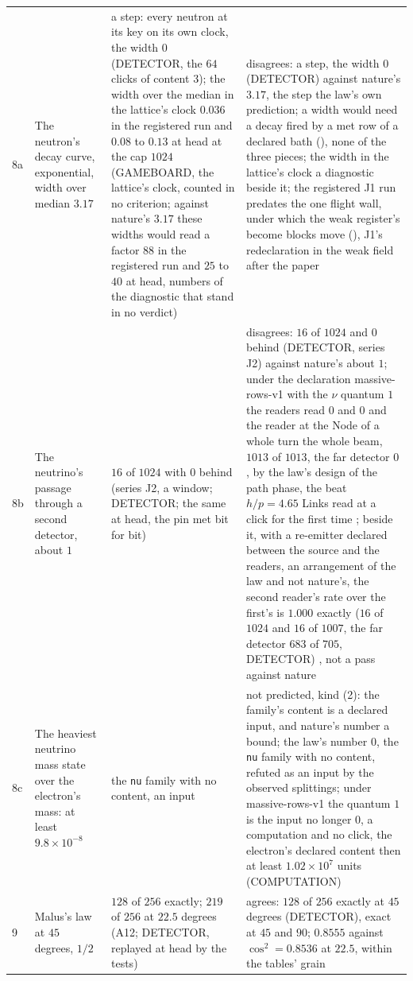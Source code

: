 {\begin{longtable}{L{0.3in}L{2.0in}L{1.5in}L{2.2in}}
8a & The neutron's decay curve, exponential, width over median $3.17$ \cite{gonzalez2021} & a step: every neutron at its key on its own clock, the width $0$ (DETECTOR, the $64$ clicks of content $3$); the width over the median in the lattice's clock $0.036$ in the registered run and $0.08$ to $0.13$ at head at the cap $1024$ (GAMEBOARD, the lattice's clock, counted in no criterion; against nature's $3.17$ these widths would read a factor $88$ in the registered run and $25$ to $40$ at head, numbers of the diagnostic that stand in no verdict) & disagrees: a step, the width $0$ (DETECTOR) against nature's $3.17$, the step the law's own prediction; a width would need a decay fired by a met row of a declared bath (\cite[section 1.8]{failrows}), none of the three pieces; the width in the lattice's clock a diagnostic beside it; the registered J1 run predates the one flight wall, under which the weak register's become blocks move (\cite[records 931 to 933]{log}), J1's redeclaration in the weak field after the paper \\
8b & The neutrino's passage through a second detector, about $1$ & $16$ of $1024$ with $0$ behind (series J2, a window; DETECTOR; the same at head, the pin met bit for bit) & disagrees: $16$ of $1024$ and $0$ behind (DETECTOR, series J2) against nature's about $1$; under the declaration massive-rows-v1 with the $\nu$ quantum $1$ the readers read $0$ and $0$ and the reader at the Node of a whole turn the whole beam, $1013$ of $1013$, the far detector $0$, by the law's design of the path phase, the beat $h/p = 4.65$ Links read at a click for the first time \cite{run8bc}; beside it, with a re-emitter declared between the source and the readers, an arrangement of the law and not nature's, the second reader's rate over the first's is $1.000$ exactly ($16$ of $1024$ and $16$ of $1007$, the far detector $683$ of $705$, DETECTOR) \cite{run8bc}, not a pass against nature \\
8c & The heaviest neutrino mass state over the electron's mass: at least $9.8 \times 10^{-8}$ \cite{pdg2024,katrin2022} & the \texttt{nu} family with no content, an input & not predicted, kind (2): the family's content is a declared input, and nature's number a bound; the law's number $0$, the \texttt{nu} family with no content, refuted as an input by the observed splittings; under massive-rows-v1 the quantum $1$ is the input no longer $0$, a computation and no click, the electron's declared content then at least $1.02 \times 10^7$ units (COMPUTATION) \cite{run8bc} \\
9 & Malus's law at $45$ degrees, $1/2$ & $128$ of $256$ exactly; $219$ of $256$ at $22.5$ degrees (A12; DETECTOR, replayed at head by the tests) & agrees: $128$ of $256$ exactly at $45$ degrees (DETECTOR), exact at $45$ and $90$; $0.8555$ against $\cos^2 = 0.8536$ at $22.5$, within the tables' grain \\

\end{longtable}}
